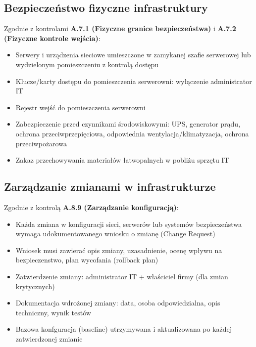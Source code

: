 \documentclass[12pt,a4paper]{article}
\providecommand{\tightlist}{\setlength{\itemsep}{0pt}\setlength{\parskip}{0pt}}
\begin{document}
\subsection{Bezpieczeństwo fizyczne infrastruktury}\label{Bezpieczeństwo-fizyczne-infrastruktury}

Zgodnie z kontrolami \textbf{A.7.1 (Fizyczne granice bezpieczeństwa)} i \textbf{A.7.2 (Fizyczne kontrole wejścia)}:

\begin{itemize}
\tightlist
\item
  Serwery i urządzenia sieciowe umieszczone w zamykanej szafie serwerowej lub wydzielonym pomieszczeniu z kontrolą dostępu
\item
  Klucze/karty dostępu do pomieszczenia serwerowni: wyłączenie administrator IT
\item
  Rejestr wejść do pomieszczenia serwerowni
\item
  Zabezpieczenie przed czynnikami środowiskowymi: UPS, generator prądu, ochrona przeciwprzepięciowa, odpowiednia wentylacja/klimatyzacja, ochrona przeciwpożarowa
\item 
  Zakaz przechowywania materiałów łatwopalnych w pobliżu sprzętu IT

\end{itemize}

\subsection{Zarządzanie zmianami w infrastrukturze}\label{Zarządzanie-zmianami-w-infrastrukturze}

Zgodnie z kontrolą \textbf{A.8.9 (Zarządzanie konfiguracją)}:

\begin{itemize}
\tightlist
\item
 Każda zmiana w konfiguracji sieci, serwerów lub systemów bezpieczeństwa wymaga udokumentowanego wniosku o zmianę (Change Request)
\item
  Wniosek musi zawierać opis zmiany, uzasadnienie, ocenę wpływu na bezpieczenstwo,
plan wycofania (rollback plan)
\item
  Zatwierdzenie zmiany: administrator IT + właściciel firmy (dla zmian krytycznych)
\item
 Dokumentacja wdrożonej zmiany: data, osoba odpowiedzialna, opis techniczny, wynik testów
\item 
  Bazowa konfguracja (baseline) utrzymywana i aktualizowana po każdej zatwierdzonej zmianie

\end{itemize}
\end{document}
